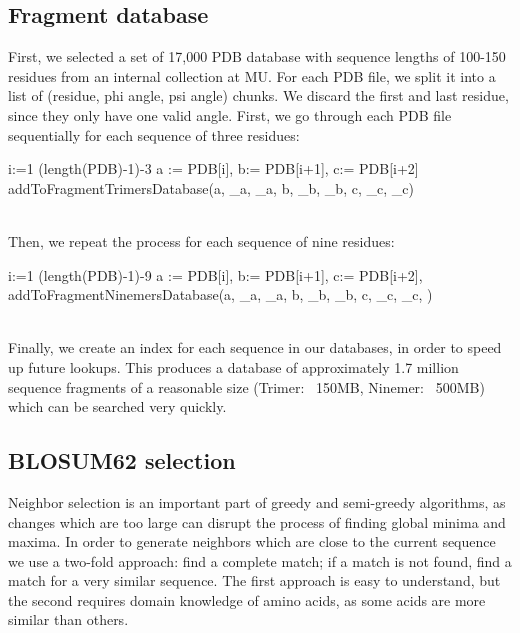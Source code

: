 \documentclass{article}
\begin{document}
\begin{enumerate}
\section{Fragment database}

First, we selected a set of 17,000 PDB database with sequence lengths of 100-150 residues from an internal collection at MU.  For each PDB file, we split it into a list of (residue, phi angle, psi angle) chunks.  We discard the first and last residue, since they only have one valid angle.  First, we go through each PDB file sequentially for each sequence of three residues:
\begin{program}

  \FOR i:=1 \TO (length(PDB)-1)-3  \DO
	a := PDB[i], b:= PDB[i+1], c:= PDB[i+2]
     	addToFragmentTrimersDatabase(a, \phi_a, \psi_a, b, \phi_b, \psi_b, c, \phi_c, \psi_c)\\\\
\END
\end{program}

Then, we repeat the process for each sequence of nine residues:

\begin{program}
  \FOR i:=1 \TO (length(PDB)-1)-9  \DO
	a := PDB[i], b:= PDB[i+1], c:= PDB[i+2],  \dotso
	addToFragmentNinemersDatabase(a, \phi_a, \psi_a, b, \phi_b, \psi_b, c, \phi_c, \psi_c, \dotso)\\\\
\END
\end{program}

Finally, we create an index for each sequence in our databases, in order to speed up future lookups.  This produces a database of approximately 1.7 million sequence fragments of a reasonable size (Trimer: ~150MB, Ninemer: ~500MB) which can be searched very quickly.

\subsection{BLOSUM62 selection}

Neighbor selection is an important part of greedy and semi-greedy algorithms, as changes which are too large can disrupt the process of finding global minima and maxima. In order to generate neighbors which are close to the current sequence we use a two-fold approach: find a complete match; if a match is not found, find a match for a very similar sequence. The first approach is easy to understand, but the second requires domain knowledge of amino acids, as some acids are more similar than others.


\end{enumerate}
\end{document}
